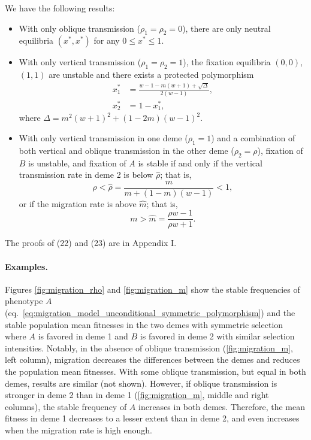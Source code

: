 \documentclass[14pt]{extarticle}
\begin{document}
We have the following results:
\begin{itemize}
\item With only oblique transmission ($\rho_1=\rho_2=0$), there are only neutral equilibria $(x^*,x^*)$ for any $0 \le x^* \le 1$.
\item With only vertical transmission ($\rho_1=\rho_2=1$), the fixation equilibria  $(0,0)$, $(1,1)$ are unstable and there exists a protected polymorphism
\begin{equation}
\begin{aligned} \label{eq:migration_model_unconditional_symmetric_polymorphism}
x_1^* &= \frac{w-1-m(w+1) + \sqrt{\Delta}}{2(w-1)}, \\
x_2^* &= 1-x_1^*,
\end{aligned}
\end{equation}
where $\Delta = m^2(w+1)^2+(1-2m)(w-1)^2$.
\item With only vertical transmission in one deme ($\rho_1=1$) and a combination of both vertical and oblique transmission in the other deme ($\rho_2=\rho$), fixation of $B$ is unstable, and fixation of $A$ is stable if and only if the vertical transmission rate in deme 2 is below $\hat \rho$; that is,
\begin{equation} \label{eq:migration_model_unconditional_symmetric_condition_rho}
\rho < \hat \rho = \frac{m}{m+(1-m)(w-1)} < 1,
\end{equation}
or if the migration rate is above $\hat m$; that is,
\begin{equation} \label{eq:migration_model_unconditional_symmetric_condition_m}
m > \hat m = \frac{\rho w - 1}{\rho w + 1}.
\end{equation}
\end{itemize}
The proofs of (22) and (23) are in Appendix I.
\paragraph{Examples.}

Figures \ref{fig:migration_rho} and \ref{fig:migration_m} show the stable frequencies of phenotype $A$~ (eq.~\ref{eq:migration_model_unconditional_symmetric_polymorphism}) and the stable population mean fitnesses in the two demes with symmetric selection where $A$ is favored in deme 1 and $B$ is favored in deme 2 with similar selection intensities.
Notably, in the absence of oblique transmission (\autoref{fig:migration_m}, left column), migration decreases the differences between the demes and reduces the population mean fitnesses.
With some oblique transmission, but equal in both demes, results are similar (not shown).
However, if oblique transmission is stronger in deme 2 than in deme 1 (\autoref{fig:migration_m}, middle and right columns), the stable frequency of $A$ increases in both demes.
Therefore, the mean fitness in deme 1 decreases to a lesser extent than in deme 2, and even increases when the migration rate is high enough.
\end{document}

